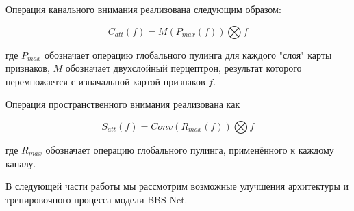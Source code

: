 Операция канального внимания реализована следующим образом:

\begin{equation}
    C_{att}(f)=M(P_{max}(f)) \bigotimes f
\end{equation}

где $P_{max}$ обозначает операцию глобального пулинга для каждого "слоя"
карты признаков, $M$ обозначает двухслойный перцептрон, 
результат которого перемножается с изначальной картой признаков $f$.

Операция пространственного внимания реализована как 

\begin{equation}
    S_{att}(f)=Conv(R_{max}(f)) \bigotimes f
\end{equation}

где $R_{max}$ обозначает операцию глобального пулинга, применённого к 
каждому каналу.

В следующей части работы мы рассмотрим возможные улучшения архитектуры и тренировочного процесса модели BBS-Net.